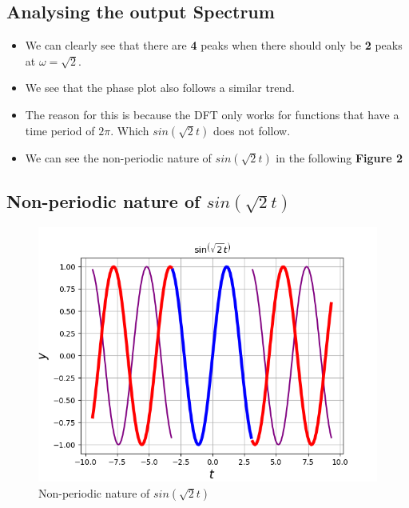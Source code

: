 \documentclass[11pt]{article}
\begin{document}
\subsection{Analysing the output Spectrum}
\begin{itemize}
    \item We can clearly see that there are \textbf{4} peaks when there should only be \textbf{2} peaks at $\omega=\sqrt{2}$.
    \item We see that the phase plot also follows a similar trend.
    \item The reason for this is because the DFT only works for functions that have a time period of $2\pi$. Which $sin(\sqrt{2}t)$ does not follow.
    \item We can see the non-periodic nature of $sin(\sqrt{2}t)$ in the following \textbf{Figure 2}
\end{itemize}

\subsection{Non-periodic nature of $sin(\sqrt{2}t)$}
\begin{figure}[H]
    \centering
    \includegraphics[scale = 0.75]{Figure_2.png}
    \caption{Non-periodic nature of $sin(\sqrt{2}t)$}
\end{figure}
\end{document}
